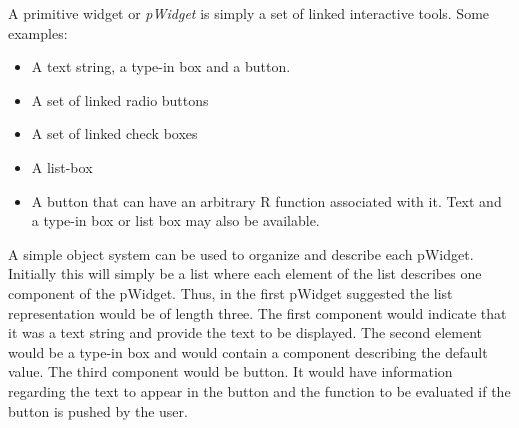 \documentclass{article}
\begin{document}
A primitive widget or {\em pWidget} is simply a set of linked interactive
tools.
Some examples:
\begin{itemize}
\item A text string, a type-in box and a button.%
\item A set of linked radio buttons
\item A set of linked check boxes
\item A list-box
\item A button that can have an arbitrary R function associated with
  it. Text and a type-in box or list box may also be available.
\end{itemize}

A simple object system can be used to organize and describe each
pWidget.
Initially this will simply be a list where each element of the list
describes one component of the pWidget.
Thus, in the first pWidget suggested the list representation would be
of length three. The first component would indicate that it was a text
string and provide the text to be displayed. The second element would
be a type-in box and would contain a component describing the default
value. The third component would be button. It would have information
regarding the text to appear in the button and the function to be
evaluated if the button is pushed by the user.
\end{document}
